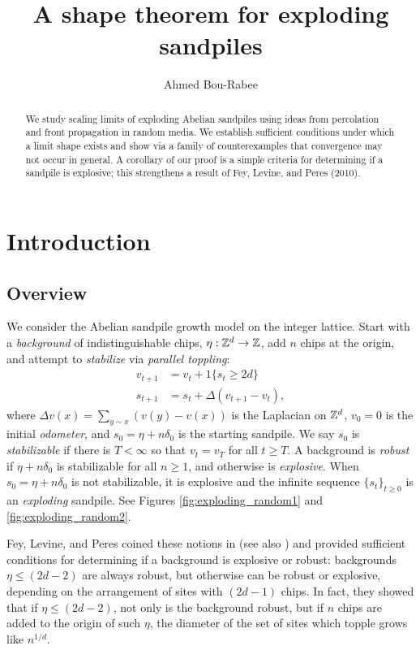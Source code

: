 \documentclass[12pt]{amsart}
\title{A shape theorem for exploding sandpiles}
\author{Ahmed Bou-Rabee}
\begin{document}
	
	\begin{abstract}
		We study scaling limits of exploding Abelian sandpiles using ideas from percolation and front propagation in random media. 
		We establish sufficient conditions under which a limit shape exists and show via a family of counterexamples that convergence may not occur in general. A corollary of our proof is a simple criteria for determining if a sandpile is explosive; this 
		strengthens a result of Fey, Levine, and Peres (2010). 
		
		
	\end{abstract}
\maketitle



\section{Introduction}
\subsection{Overview}
We consider the Abelian sandpile growth model on the integer lattice. Start with a {\it background} of indistinguishable chips, $\eta: \mathbb{Z}^d \to \mathbb{Z}$, add $n$ chips at the origin, 
and attempt to {\it stabilize} via {\it parallel toppling}:
\begin{equation} \label{eq:parallel_toppling}
\begin{aligned}
v_{t+1} &= v_{t} + 1 \{ s_{t} \geq 2 d \} \\
s_{t+1} &= s_{t} + \Delta (v_{t+1} - v_{t}), 
\end{aligned}
\end{equation}
where $\Delta v(x) = \sum_{y\sim x} (v(y) - v(x))$ is the Laplacian on $\mathbb{Z}^d$, $v_0 = 0$ is the initial {\it odometer}, and $s_0 = \eta + n  \delta_0$ is the starting sandpile. We say $s_0$ is {\it stabilizable} if there is $T < \infty$ so that 
$v_{t} = v_{T}$ for all $t \geq T$. A background is {\it robust} 
if $\eta + n  \delta_0$ is stabilizable for all $n \geq 1$, and otherwise 
is {\it explosive}. When $s_0 = \eta + n  \delta_0$ is not stabilizable, it is explosive and the infinite sequence $\{s_t\}_{t \geq 0}$ is an {\it exploding} sandpile. See Figures \ref{fig:exploding_random1} and \ref{fig:exploding_random2}.




Fey, Levine, and Peres coined these notions in \cite{fey2010growth} (see also \cite{fey2005organized}) and provided sufficient conditions for determining if a background is explosive or robust: backgrounds $\eta \leq (2d-2)$ are always robust, but otherwise can be robust or explosive, depending on the arrangement of sites with $(2d-1)$ chips. In fact, they showed that if $\eta \leq (2d - 2)$, not only 
is the background robust, but if $n$ chips are added to the origin of such $\eta$, the diameter of the set of sites which topple grows like $n^{1/d}$. 
\end{document}
